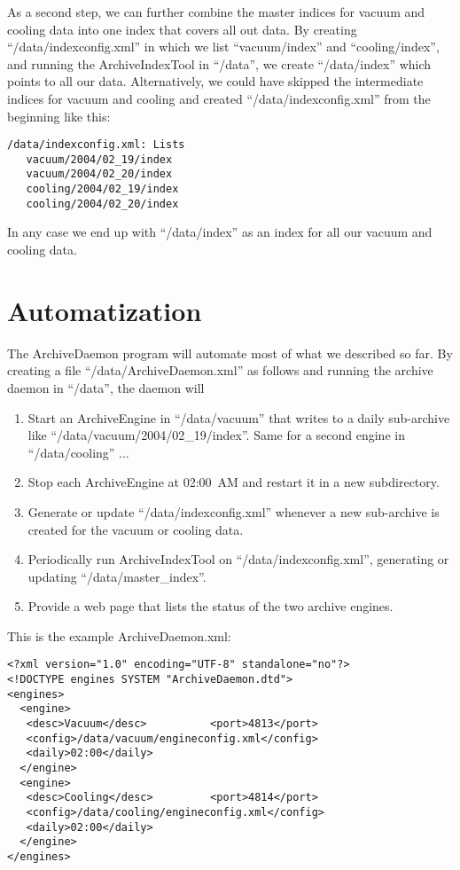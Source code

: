 As a second step, we can further combine the master indices for vacuum
and cooling data into one index that covers all out data. By creating
``/data/indexconfig.xml'' in which we list ``vacuum/index'' and
``cooling/index'', and running the ArchiveIndexTool in
``/data'', we create ``/data/index'' which points to all our data.
Alternatively, we could have skipped the intermediate indices for
vacuum and cooling and created ``/data/indexconfig.xml'' from the
beginning like this:
\begin{lstlisting}[frame=none,keywordstyle=\sffamily]
/data/indexconfig.xml: Lists
   vacuum/2004/02_19/index
   vacuum/2004/02_20/index
   cooling/2004/02_19/index
   cooling/2004/02_20/index
\end{lstlisting}

\noindent In any case we end up with ``/data/index'' as an index for
all our vacuum and cooling data.

\section{Automatization}
The ArchiveDaemon program will automate most of what we described so
far. By creating a file ``/data/ArchiveDaemon.xml'' as follows and
running the archive daemon in ``/data'', the daemon will 
\begin{enumerate}
\item Start an ArchiveEngine in ``/data/vacuum'' that writes to
      a daily sub-archive like ``/data/vacuum/2004/02\_19/index''.
      Same for a second engine in ``/data/cooling'' ...
\item Stop each ArchiveEngine at 02:00~AM and restart it in a new
      subdirectory.  
\item Generate or update ``/data/indexconfig.xml'' whenever a new
      sub-archive is created for the vacuum or cooling data.
\item Periodically run ArchiveIndexTool on ``/data/indexconfig.xml'',
      generating or updating ``/data/master\_index''.
\item Provide a web page that lists the status of the two archive
      engines.
\end{enumerate}

\noindent This is the example ArchiveDaemon.xml:
\begin{lstlisting}[frame=none,keywordstyle=\sffamily]
<?xml version="1.0" encoding="UTF-8" standalone="no"?>
<!DOCTYPE engines SYSTEM "ArchiveDaemon.dtd">
<engines>
  <engine>
   <desc>Vacuum</desc>          <port>4813</port>
   <config>/data/vacuum/engineconfig.xml</config>
   <daily>02:00</daily>
  </engine>
  <engine>
   <desc>Cooling</desc>         <port>4814</port>
   <config>/data/cooling/engineconfig.xml</config>
   <daily>02:00</daily>
  </engine>
</engines>
\end{lstlisting}

